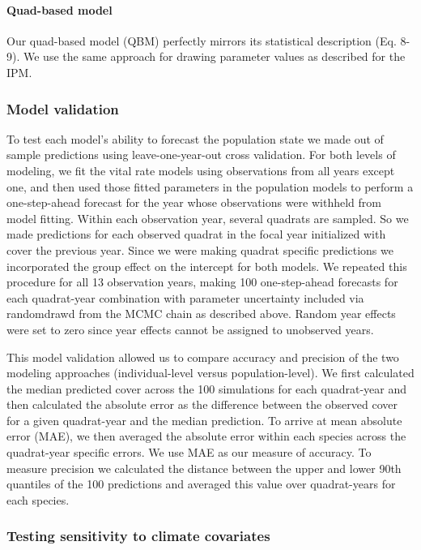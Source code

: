 \documentclass[12pt,]{article}
\begin{document}
\paragraph{Quad-based model}\label{quad-based-model}

Our quad-based model (QBM) perfectly mirrors its statistical description
(Eq. 8-9). We use the same approach for drawing parameter values as
described for the IPM.

\subsubsection{Model validation}\label{model-validation}

To test each model's ability to forecast the population state we made
out of sample predictions using leave-one-year-out cross validation. For
both levels of modeling, we fit the vital rate models using observations
from all years except one, and then used those fitted parameters in the
population models to perform a one-step-ahead forecast for the year
whose observations were withheld from model fitting. Within each
observation year, several quadrats are sampled. So we made predictions
for each observed quadrat in the focal year initialized with cover the
previous year. Since we were making quadrat specific predictions we
incorporated the group effect on the intercept for both models. We
repeated this procedure for all 13 observation years, making 100
one-step-ahead forecasts for each quadrat-year combination with
parameter uncertainty included via randomdrawd from the MCMC chain as
described above. Random year effects were set to zero since year effects
cannot be assigned to unobserved years.

This model validation allowed us to compare accuracy and precision of
the two modeling approaches (individual-level versus population-level).
We first calculated the median predicted cover across the 100
simulations for each quadrat-year and then calculated the absolute error
as the difference between the observed cover for a given quadrat-year
and the median prediction. To arrive at mean absolute error (MAE), we
then averaged the absolute error within each species across the
quadrat-year specific errors. We use MAE as our measure of accuracy. To
measure precision we calculated the distance between the upper and lower
90th quantiles of the 100 predictions and averaged this value over
quadrat-years for each species.

\subsubsection{Testing sensitivity to climate
covariates}\label{testing-sensitivity-to-climate-covariates}
\end{document}
